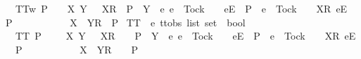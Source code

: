 \ \ {\isachardoublequoteopen}TT{}w\ P\ {\isacharequal}\ {\isacharparenleft}{\isasymforall}\ {\isasymrho}\ X\ Y{\isachardot}\ {\isacharparenleft}{\isasymrho}\ {\isacharat}\ {\isacharbrackleft}{\isacharbrackleft}X{\isacharbrackright}\isactrlsub R{\isacharbrackright}\ {\isasymin}\ P\ {\isasymand}\ {\isacharparenleft}Y\ {\isasyminter}\ {\isacharbraceleft}e{\isachardot}\ {\isacharparenleft}e\ {\isasymnoteq}\ Tock\ {\isasymand}\ {\isasymrho}\ {\isacharat}\ {\isacharbrackleft}{\isacharbrackleft}e{\isacharbrackright}\isactrlsub E{\isacharbrackright}\ {\isasymin}\ P{\isacharparenright}\ {\isasymor}\ {\isacharparenleft}e\ {\isacharequal}\ Tock\ {\isasymand}\ {\isasymrho}\ {\isacharat}\ {\isacharbrackleft}{\isacharbrackleft}X{\isacharbrackright}\isactrlsub R{\isacharcomma}\ {\isacharbrackleft}e{\isacharbrackright}\isactrlsub E{\isacharbrackright}\ {\isasymin}\ P{\isacharparenright}\ {\isacharbraceright}\ {\isacharequal}\ {\isacharbraceleft}{\isacharbraceright}{\isacharparenright}{\isacharparenright}\isanewline
\ \ \ \ \ {\isasymlongrightarrow}\ {\isasymrho}\ {\isacharat}\ {\isacharbrackleft}{\isacharbrackleft}X\ {\isasymunion}\ Y{\isacharbrackright}\isactrlsub R{\isacharbrackright}\ {\isasymin}\ P{\isacharparenright}{\isachardoublequoteclose}\isanewline
\isanewline
{}\isamarkupfalse%
\ TT{}\ {\isacharcolon}{\isacharcolon}\ {\isachardoublequoteopen}{\isacharprime}e\ ttobs\ list\ set\ {\isasymRightarrow}\ bool{\isachardoublequoteclose}\ \isanewline
\ \ {\isachardoublequoteopen}TT{}\ P\ {\isacharequal}\ {\isacharparenleft}{\isasymforall}\ {\isasymrho}\ {\isasymsigma}\ X\ Y{\isachardot}\ {\isacharparenleft}{\isasymrho}\ {\isacharat}\ {\isacharbrackleft}{\isacharbrackleft}X{\isacharbrackright}\isactrlsub R{\isacharbrackright}\ {\isacharat}\ {\isasymsigma}\ {\isasymin}\ P\ {\isasymand}\ {\isacharparenleft}Y\ {\isasyminter}\ {\isacharbraceleft}e{\isachardot}\ {\isacharparenleft}e\ {\isasymnoteq}\ Tock\ {\isasymand}\ {\isasymrho}\ {\isacharat}\ {\isacharbrackleft}{\isacharbrackleft}e{\isacharbrackright}\isactrlsub E{\isacharbrackright}\ {\isasymin}\ P{\isacharparenright}\ {\isasymor}\ {\isacharparenleft}e\ {\isacharequal}\ Tock\ {\isasymand}\ {\isasymrho}\ {\isacharat}\ {\isacharbrackleft}{\isacharbrackleft}X{\isacharbrackright}\isactrlsub R{\isacharcomma}\ {\isacharbrackleft}e{\isacharbrackright}\isactrlsub E{\isacharbrackright}\ {\isasymin}\ P{\isacharparenright}\ {\isacharbraceright}\ {\isacharequal}\ {\isacharbraceleft}{\isacharbraceright}{\isacharparenright}{\isacharparenright}\isanewline
\ \ \ \ \ {\isasymlongrightarrow}\ {\isasymrho}\ {\isacharat}\ {\isacharbrackleft}{\isacharbrackleft}X\ {\isasymunion}\ Y{\isacharbrackright}\isactrlsub R{\isacharbrackright}\ {\isacharat}\ {\isasymsigma}\ {\isasymin}\ P{\isacharparenright}{\isachardoublequoteclose}\isanewline
